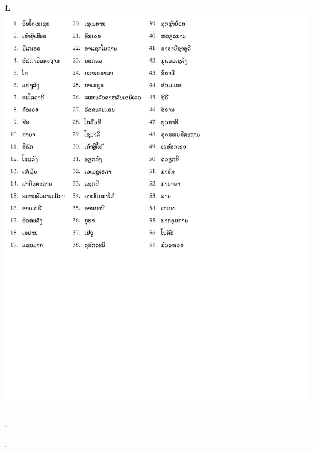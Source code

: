 \L{\includegraphics[bb = 0 320 500 800]{geo57Lao.pdf}}
%
\begin{assgts}
\item \findland.
\item \guessond.
\end{assgts}
%

\makepart{\respsing {\teamcont}}
\pagestyle{somestyle}


